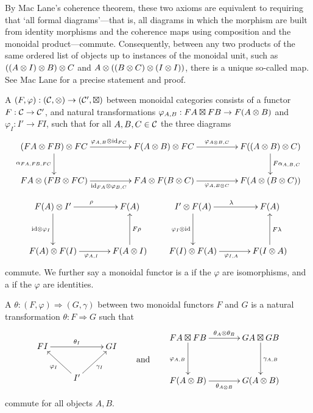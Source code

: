 By Mac Lane's coherence theorem, these two axioms are equivalent to requiring
that `all formal diagrams'---that is, all diagrams in which the morphism are
built from identity morphisms and the coherence maps using composition and the
monoidal product---commute. Consequently, between any two products of the same
ordered list of objects up to instances of the monoidal unit, such as $((A \otimes
I) \otimes B) \otimes C$ and $A \otimes ((B \otimes C) \otimes (I \otimes I))$, there is a unique
so-called  map. See Mac Lane \cite[Corollary of Theorem
VII.2.1]{Mac98} for a precise statement and proof.

A  $(F, \varphi): ({\mathcal{C}},\otimes) \to ({\mathcal{C}}',\boxtimes)$
between monoidal categories consists of a functor $F: {\mathcal{C}} \to {\mathcal{C}}'$, and natural
transformations $\varphi_{A,B}: FA \boxtimes FB \to F(A \otimes B)$ and $\varphi_I:
I' \to FI$, such that for all $A,B,C \in {\mathcal{C}}$ the three diagrams
\[
  \xymatrixcolsep{4pc}
  \xymatrix{
    (FA \ot FB) \ot FC \ar[d]_{\a_{FA,FB,FC}} \ar[r]^{\varphi_{A,B} \ot \idn_{FC}} &
    F(A \ot B) \ot FC \ar[r]^{\varphi_{A\ot B,C}} & F((A \ot B) \ot C) \ar[d]^{F\a_{A,B,C}}\\
    FA \ot (FB \ot FC) \ar[r]_{\idn_{FA} \ot \varphi_{B,C}} & FA \ot F(B \ot C)
    \ar[r]_{\varphi_{A,B\ot C}} & F(A \ot (B \ot C))
  }
\]
\[
  \xymatrixcolsep{3pc}
  \xymatrixrowsep{3pc}
  \xymatrix{
    F(A) \ot I' \ar[d]_{\idn \ot \varphi_I} \ar[r]^{\rho} & F(A) \\
    F(A) \ot F(I) \ar[r]_{\varphi_{A,I}} & F(A \ot I) \ar[u]_{F\rho} 
  }
  \qquad
  \xymatrix{
    I' \ot F(A) \ar[d]_{\varphi_I \ot \idn} \ar[r]^{\lambda} & F(A) \\
    F(I) \ot F(A) \ar[r]_{\varphi_{I,A}} & F(I \ot A) \ar[u]_{F\lambda} 
  }
\]
commute. We further say a monoidal functor is a 
if the $\varphi$ are isomorphisms, and a  if the
$\varphi$ are identities. 

A  $\theta: (F,\varphi) \Rightarrow
(G,\gamma)$ between two monoidal functors $F$ and $G$ is a natural
transformation $\theta: F \Rightarrow G$ such that
\[
  \begin{aligned}
    \xymatrix{
      FI \ar[rr]^{\theta_I}&& GI \\
      & I' \ar[ul]^{\varphi_I} \ar[ur]_{\gamma_I}
    } 
  \end{aligned} 
  \qquad 
  \mbox{and}
  \qquad
  \begin{aligned}
    \xymatrixcolsep{3pc}
    \xymatrixrowsep{3pc}
    \xymatrix{
      FA \boxtimes FB \ar[r]^{\theta_A \ot \theta_B} \ar[d]_{\varphi_{A,B}} 
      & GA \boxtimes GB \ar[d]^{\gamma_{A,B}}\\
      F(A \ot B) \ar[r]_{\theta_{A\ot B}} & G(A \ot B)
    }
  \end{aligned} 
\]
commute for all objects $A,B$.


